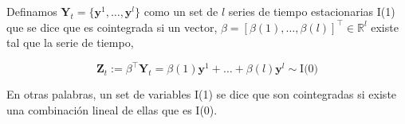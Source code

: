 \documentclass{beamer}
\begin{document}
            \begin{frame}  
            Definamos $\mathbf{Y}_t = \{\mathbf{y}^1, \dots, \mathbf{y}^l\}$
            como un set de $l$ series de tiempo estacionarias
            I(1) que se dice que es cointegrada si un vector,
            $\beta=[\beta(1),\dots,\beta(l)]^\intercal \in \mathbb{R}^l$  existe tal que la serie de tiempo,
            
            \begin{equation}
            \mathbf{Z}_t:= \beta^\intercal \mathbf{Y}_t = \beta(1) \mathbf{y}^1 + \dots + \beta(l) \mathbf{y}^l \sim
            \text{I(0)}
            \end{equation}
            
            En otras palabras, un set de variables I(1) se dice que son cointegradas si
            existe una combinación lineal de ellas que es I(0).
            \end{frame}
\end{document}
